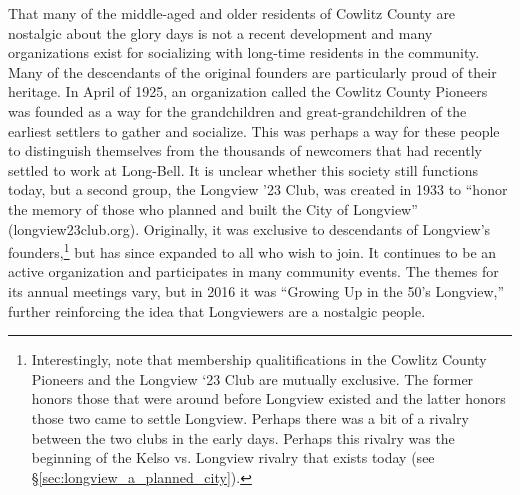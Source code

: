 That many of the middle-aged and older residents of Cowlitz County are nostalgic about the glory days is not a recent development and many organizations exist for socializing with long-time residents in the community. Many of the descendants of the original founders are particularly proud of their heritage. In April of 1925, an organization called the Cowlitz County Pioneers was founded as a way for the grandchildren and great-grandchildren of the earliest settlers to gather and socialize. This was perhaps a way for these people to distinguish themselves from the thousands of newcomers that had recently settled to work at Long-Bell. It is unclear whether this society still functions today, but a second group, the Longview '23 Club, was created in 1933 to ``honor the memory of those who planned and built the City of Longview'' (longview23club.org). Originally, it was exclusive to descendants of Longview's founders,\footnote{Interestingly, note that membership qualitifications in the Cowlitz County Pioneers and the Longview `23 Club are mutually exclusive. The former honors those that were around before Longview existed and the latter honors those two came to settle Longview. Perhaps there was a bit of a rivalry between the two clubs in the early days. Perhaps this rivalry was the beginning of the Kelso vs. Longview rivalry that exists today (see \S\ref{sec:longview_a_planned_city}).} but has since expanded to all who wish to join. It continues to be an active organization and participates in many community events. The themes for its annual meetings vary, but in 2016 it was ``Growing Up in the 50's Longview,'' further reinforcing the idea that Longviewers are a nostalgic people.

